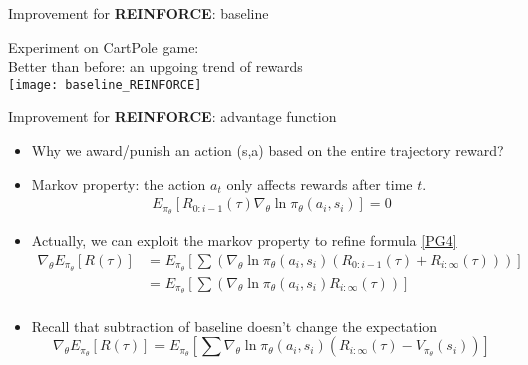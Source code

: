 \begin{frame}{Improvement for \textbf{REINFORCE}: baseline}
    \vspace{0.2cm}
    \begin{center}Experiment on CartPole game:\\Better than before: an upgoing trend of rewards\\\texttt{[image: baseline\_REINFORCE]}\end{center}
\end{frame}

\begin{frame}{Improvement for \textbf{REINFORCE}: advantage function}
    \begin{itemize}
        \item Why we award/punish an action (s,a) based on the entire trajectory reward?\\
        \item Markov property: the action $a_t$ only affects rewards after time $t$.
        \begin{equation}
            \label{indp}
            \begin{split}
                E_{\pi_\theta}[R_{0:i-1}(\tau)\nabla_\theta\ln\pi_\theta(a_i,s_i)] = 0
            \end{split}
        \end{equation}  
        \item Actually, we can exploit the markov property to refine formula \ref{PG4}
            \begin{equation}
                    \label{refinePG1}
                    \begin{split}
                        \nabla_\theta E_{\pi_{\theta}}[R(\tau)] &=E_{\pi_{\theta}}[\sum(\nabla_\theta\ln\pi_\theta(a_i,s_i)(R_{0:i-1}(\tau)+R_{i:\infty}(\tau)))]\\
                        &=E_{\pi_{\theta}}[\sum(\nabla_\theta\ln\pi_\theta(a_i,s_i)R_{i:\infty}(\tau))]\\
                    \end{split}
            \end{equation}
        \item Recall that subtraction of baseline doesn't change the expectation
        \begin{equation}
                    \label{refinePG2}
                        \nabla_\theta E_{\pi_{\theta}}[R(\tau)] = E_{\pi_{\theta}}[\sum\nabla_\theta\ln\pi_\theta(a_i,s_i)(R_{i:\infty}(\tau)-V_{\pi_\theta}(s_i))]
        \end{equation}

    \end{itemize}  
\end{frame}

